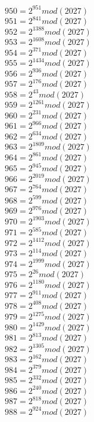 \documentclass[12pt, letterpaper]{article}
\begin{document}
\begin{itemize}
\begin{multicols}{3}
$950= 2^{951} mod (2027)$\\
$951= 2^{841} mod (2027)$\\
$952= 2^{1388} mod (2027)$\\
$953= 2^{1608} mod (2027)$\\
$954= 2^{371} mod (2027)$\\
$955= 2^{1434} mod (2027)$\\
$956= 2^{936} mod (2027)$\\
$957= 2^{176} mod (2027)$\\
$958= 2^{43} mod (2027)$\\
$959= 2^{1261} mod (2027)$\\
$960= 2^{231} mod (2027)$\\
$961= 2^{966} mod (2027)$\\
$962= 2^{634} mod (2027)$\\
$963= 2^{1809} mod (2027)$\\
$964= 2^{861} mod (2027)$\\
$965= 2^{945} mod (2027)$\\
$966= 2^{2019} mod (2027)$\\
$967= 2^{764} mod (2027)$\\
$968= 2^{599} mod (2027)$\\
$969= 2^{976} mod (2027)$\\
$970= 2^{1903} mod (2027)$\\
$971= 2^{585} mod (2027)$\\
$972= 2^{1412} mod (2027)$\\
$973= 2^{114} mod (2027)$\\
$974= 2^{1999} mod (2027)$\\
$975= 2^{26} mod (2027)$\\
$976= 2^{1180} mod (2027)$\\
$977= 2^{911} mod (2027)$\\
$978= 2^{408} mod (2027)$\\
$979= 2^{1275} mod (2027)$\\
$980= 2^{1429} mod (2027)$\\
$981= 2^{813} mod (2027)$\\
$982= 2^{1305} mod (2027)$\\
$983= 2^{162} mod (2027)$\\
$984= 2^{379} mod (2027)$\\
$985= 2^{332} mod (2027)$\\
$986= 2^{240} mod (2027)$\\
$987= 2^{818} mod (2027)$\\
$988= 2^{924} mod (2027)$\\

\end{multicols}
\end{itemize}
\end{document}
